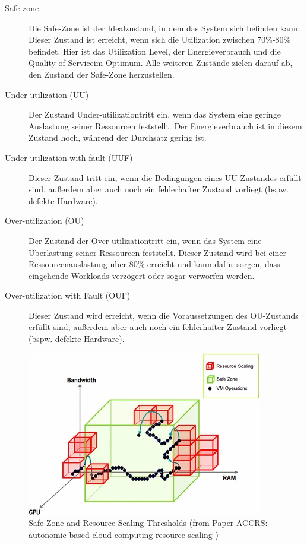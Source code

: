 \documentclass[a4paper,10pt]{scrartcl}
\begin{document}
\begin{description}
\item[Safe-zone]
Die Safe-Zone ist der Idealzustand, in dem das System sich befinden kann. Dieser Zustand ist erreicht, wenn sich die Utilization zwischen 70\%-80\% befindet. Hier ist das Utilization Level, der Energieverbrauch und die \glqq Quality of Service\grqq im Optimum.
Alle weiteren Zustände zielen darauf ab, den Zustand der Safe-Zone herzustellen.
\item[Under-utilization (UU)]
Der Zustand \glqq Under-utilization\grqq tritt ein, wenn das System eine geringe Auslastung seiner Ressourcen feststellt. Der Energieverbrauch ist in diesem Zustand hoch, während der Durchsatz gering ist.
\item[Under-utilization with fault (UUF)]
Dieser Zustand tritt ein, wenn die Bedingungen eines UU-Zustandes erfüllt sind, außerdem aber auch noch ein fehlerhafter Zustand vorliegt (bspw. defekte Hardware).
\item[Over-utilization (OU)]
Der Zustand der \glqq Over-utilization\grqq tritt ein, wenn das System eine Überlastung seiner Ressourcen feststellt. Dieser Zustand wird bei einer Ressourcenauslastung über 80\% erreicht und kann dafür sorgen, dass eingehende Workloads verzögert oder sogar verworfen werden.
\item[Over-utilization with Fault (OUF)]
Dieser Zustand wird erreicht, wenn die Voraussetzungen des OU-Zustands erfüllt sind, außerdem aber auch noch ein fehlerhafter Zustand vorliegt (bspw. defekte Hardware).
\end{description}

\begin{figure}[htbp]
  \centering
  \includegraphics[scale=1.2]{img/SDTScaling.png}
  \caption{Safe-Zone and Resource Scaling Thresholds (from Paper ACCRS: autonomic based cloud computing resource scaling )}
\end{figure}
\end{document}
